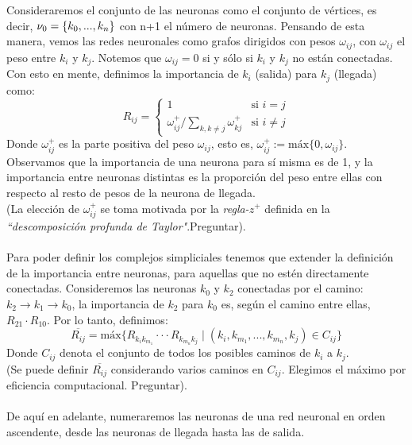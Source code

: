 \documentclass[12pt, a4paper]{article}
\numberwithin{equation}{section}
\theoremstyle{definition}
\theoremstyle{remark}
\theoremstyle{plain}
\begin{document}
		Consideraremos el conjunto de las neuronas como el conjunto de vértices, es decir, ${\Large \nu}_{0}=\{k_{0},...,k_{n}\}$ con n+1 el número de neuronas. Pensando de esta manera, vemos las redes
		neuronales como grafos dirigidos con pesos $\omega_{ij}$, con $\omega_{ij}$ el peso entre $k_{i}$ y $k_{j}$. Notemos que $\omega_{ij}=0$ si y sólo si $k_{i}$ y $k_{j}$ no están conectadas.
		Con esto en mente, definimos la importancia de $k_{i}$ (salida) para $k_{j}$ (llegada) como:
		\begin{equation}
			R_{ij}=  \left \{ 
				\begin{array}{ll}
					1 & \text{si } i=j \\
					\omega_{ij}^{+}/\sum_{k,k \neq j}\omega_{kj}^{+} & \text{si } i \neq j
				\end{array}
			\right. 
		\end{equation}
		Donde $\omega_{ij}^{+}$ es la parte positiva del peso $\omega_{ij}$, esto es, $\omega_{ij}^{+}:=\text{máx}\{0,\omega_{ij}\}$.\\ 
		Observamos que la importancia de una neurona para sí misma es de 1, y la importancia entre neuronas distintas es la proporción del peso entre ellas con respecto 
		al resto de pesos de la neurona de llegada.\\
		(La elección de $\omega_{ij}^{+}$ se toma motivada por la \textit{regla-}$z^{+}$ definida en la 
		\textit{``descomposición profunda de Taylor"}.Preguntar). \\
		\\
		Para poder definir los complejos simpliciales tenemos que extender la definición de la importancia entre neuronas, para aquellas que no estén directamente conectadas. Consideremos 
		las neuronas $k_{0}$ y $k_{2}$ conectadas por el camino: $k_{2} \rightarrow k_{1} \rightarrow k_{0}$, la importancia de $k_{2}$ para $k_{0}$ es, según el camino entre ellas, $R_{21} \cdot R_{10}$.
		Por lo tanto, definimos:
		\begin{equation}
			\overline{R_{ij}}=\text{máx}\{R_{k_{i}k_{m_{1}}} \cdot\cdot\cdot R_{k_{m_{n}}k_{j}} \mid (k_{i},k_{m_{1}},...,k_{m_{n}},k_{j}) \in C_{ij} \}
			\label{def:ie}
		\end{equation}	
		Donde $C_{ij}$ denota el conjunto de todos los posibles caminos de $k_{i}$ a $k_{j}$. \\
		(Se puede definir $\overline{R_{ij}}$ considerando varios caminos en $C_{ij}$. Elegimos el máximo 
		por eficiencia computacional. Preguntar). \\
		\\
		De aquí en adelante, numeraremos las neuronas de una red neuronal en orden ascendente, desde las neuronas de llegada hasta las de salida.\\
		
\end{document}
